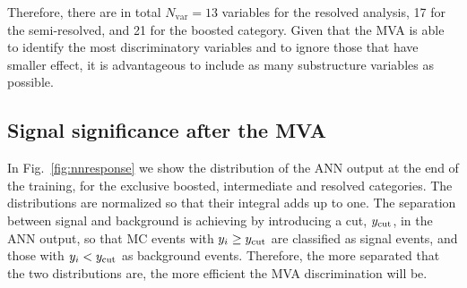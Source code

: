 %
Therefore, there are in total $N_{\mathrm{var}}=13$ variables for the resolved analysis,
17 for the semi-resolved, and 21 for the boosted category.
%
Given that the MVA is able to identify the most discriminatory variables
and to ignore those that have smaller effect, it is advantageous to
include as many substructure variables as possible.
%

\subsection{Signal significance after the MVA}
\label{sec:signalsignificance}

In Fig.~\ref{fig:nnresponse} we show the distribution of
the ANN output at the end of the training, for the exclusive
boosted, intermediate and resolved categories.
%
The distributions are normalized so that their integral
  adds up to one.
%
The  separation between signal and background is achieving by introducing
a cut, $y_{\rm cut}$, in the ANN output, so that MC events with $y_i\ge
y_{\rm cut}$ are classified as signal events, and those with
 $y_i <
y_{\rm cut}$ as background events.
%
Therefore,
the more separated that the two distributions are, the more efficient
the MVA discrimination will be.



